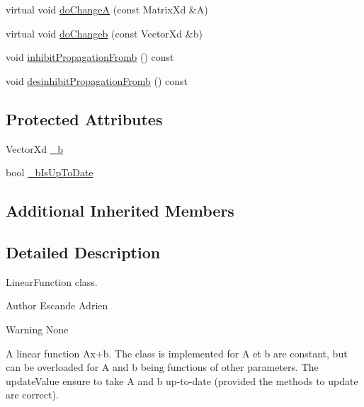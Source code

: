 {\bf }\par
\begin{DoxyCompactItemize}
\item 
virtual void \hyperlink{classocra_1_1LinearFunction_ab573c2f615d2edefb647979d3cc3cf46}{do\+ChangeA} (const Matrix\+Xd \&A)
\item 
virtual void \hyperlink{classocra_1_1LinearFunction_ad6003a64fd49102599620206ca161345}{do\+Changeb} (const Vector\+Xd \&b)
\end{DoxyCompactItemize}

{\bf }\par
\begin{DoxyCompactItemize}
\item 
void \hyperlink{classocra_1_1LinearFunction_a00e9619895b8a224cfb86c7e6c2637f5}{inhibit\+Propagation\+Fromb} () const 
\item 
void \hyperlink{classocra_1_1LinearFunction_a891828d31c0ea00e786a12b1f4b1c595}{desinhibit\+Propagation\+Fromb} () const 
\end{DoxyCompactItemize}

\subsection*{Protected Attributes}
\begin{DoxyCompactItemize}
\item 
Vector\+Xd \hyperlink{classocra_1_1LinearFunction_ab556d7683de415e8273bdbf955f7da02}{\+\_\+b}
\item 
bool \hyperlink{classocra_1_1LinearFunction_a97de5274c98711b37b04aed99c237ce6}{\+\_\+b\+Is\+Up\+To\+Date}
\end{DoxyCompactItemize}
\subsection*{Additional Inherited Members}


\subsection{Detailed Description}
Linear\+Function class. 

\begin{DoxyAuthor}{Author}
Escande Adrien 
\end{DoxyAuthor}
\begin{DoxyWarning}{Warning}
None
\end{DoxyWarning}
A linear function Ax+b. The class is implemented for A et b are constant, but can be overloaded for A and b being functions of other parameters. The update\+Value ensure to take A and b up-\/to-\/date (provided the methods to update are correct). 

